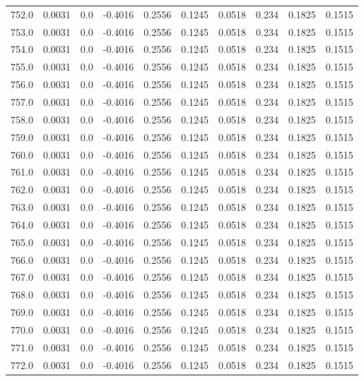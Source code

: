 \begin{longtable}{lrrrrrrrrr}
752.0 & 0.0031 & 0.0 & -0.4016 & 0.2556 & 0.1245 & 0.0518 & 0.234 & 0.1825 & 0.1515 \\
753.0 & 0.0031 & 0.0 & -0.4016 & 0.2556 & 0.1245 & 0.0518 & 0.234 & 0.1825 & 0.1515 \\
754.0 & 0.0031 & 0.0 & -0.4016 & 0.2556 & 0.1245 & 0.0518 & 0.234 & 0.1825 & 0.1515 \\
755.0 & 0.0031 & 0.0 & -0.4016 & 0.2556 & 0.1245 & 0.0518 & 0.234 & 0.1825 & 0.1515 \\
756.0 & 0.0031 & 0.0 & -0.4016 & 0.2556 & 0.1245 & 0.0518 & 0.234 & 0.1825 & 0.1515 \\
757.0 & 0.0031 & 0.0 & -0.4016 & 0.2556 & 0.1245 & 0.0518 & 0.234 & 0.1825 & 0.1515 \\
758.0 & 0.0031 & 0.0 & -0.4016 & 0.2556 & 0.1245 & 0.0518 & 0.234 & 0.1825 & 0.1515 \\
759.0 & 0.0031 & 0.0 & -0.4016 & 0.2556 & 0.1245 & 0.0518 & 0.234 & 0.1825 & 0.1515 \\
760.0 & 0.0031 & 0.0 & -0.4016 & 0.2556 & 0.1245 & 0.0518 & 0.234 & 0.1825 & 0.1515 \\
761.0 & 0.0031 & 0.0 & -0.4016 & 0.2556 & 0.1245 & 0.0518 & 0.234 & 0.1825 & 0.1515 \\
762.0 & 0.0031 & 0.0 & -0.4016 & 0.2556 & 0.1245 & 0.0518 & 0.234 & 0.1825 & 0.1515 \\
763.0 & 0.0031 & 0.0 & -0.4016 & 0.2556 & 0.1245 & 0.0518 & 0.234 & 0.1825 & 0.1515 \\
764.0 & 0.0031 & 0.0 & -0.4016 & 0.2556 & 0.1245 & 0.0518 & 0.234 & 0.1825 & 0.1515 \\
765.0 & 0.0031 & 0.0 & -0.4016 & 0.2556 & 0.1245 & 0.0518 & 0.234 & 0.1825 & 0.1515 \\
766.0 & 0.0031 & 0.0 & -0.4016 & 0.2556 & 0.1245 & 0.0518 & 0.234 & 0.1825 & 0.1515 \\
767.0 & 0.0031 & 0.0 & -0.4016 & 0.2556 & 0.1245 & 0.0518 & 0.234 & 0.1825 & 0.1515 \\
768.0 & 0.0031 & 0.0 & -0.4016 & 0.2556 & 0.1245 & 0.0518 & 0.234 & 0.1825 & 0.1515 \\
769.0 & 0.0031 & 0.0 & -0.4016 & 0.2556 & 0.1245 & 0.0518 & 0.234 & 0.1825 & 0.1515 \\
770.0 & 0.0031 & 0.0 & -0.4016 & 0.2556 & 0.1245 & 0.0518 & 0.234 & 0.1825 & 0.1515 \\
771.0 & 0.0031 & 0.0 & -0.4016 & 0.2556 & 0.1245 & 0.0518 & 0.234 & 0.1825 & 0.1515 \\
772.0 & 0.0031 & 0.0 & -0.4016 & 0.2556 & 0.1245 & 0.0518 & 0.234 & 0.1825 & 0.1515 \\

\end{longtable}
